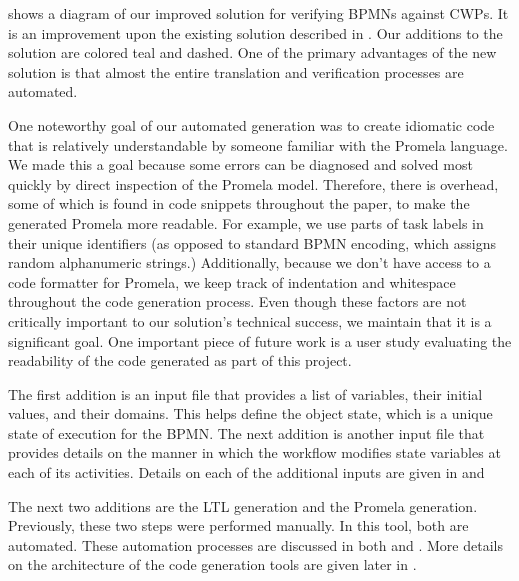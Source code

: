 \begin{comment}
Automatic translation from CWP and BPMN to LTL properties and Promela code, respectively, is not trivial. First, the edges of the CWP must follow a consistent expression language in order to be interpreted automatically. Next, the object state must be clearly defined. Also, several implied BPMN semantics lead to ambiguous workflow structures, requiring additional automated reasoning. Next, the complete conditions of decision gateways in the workflow must be expressed somewhere. Finally, the environment for running the workflow must be defined, including variables and behavior models for BPMN activities.
\end{comment}

 shows a diagram of our improved solution for verifying BPMNs against CWPs. It is an improvement upon the existing solution described in . Our additions to the solution are colored teal and dashed. One of the primary advantages of the new solution is that almost the entire translation and verification processes are automated.

One noteworthy goal of our automated generation was to create idiomatic code that is relatively understandable by someone familiar with the Promela language. We made this a goal because some errors can be diagnosed and solved most quickly by direct inspection of the Promela model. Therefore, there is overhead, some of which is found in code snippets throughout the paper, to make the generated Promela more readable. For example, we use parts of task labels in their unique identifiers (as opposed to standard BPMN encoding, which assigns random alphanumeric strings.) Additionally, because we don't have access to a code formatter for Promela, we keep track of indentation and whitespace throughout the code generation process. Even though these factors are not critically important to our solution's technical success, we maintain that it is a significant goal. One important piece of future work is a user study evaluating the readability of the code generated as part of this project.

The first addition is an input file that provides a list of variables, their initial values, and their domains. This helps define the object state, which is a unique state of execution for the BPMN. The next addition is another input file that provides details on the manner in which the workflow modifies state variables at each of its activities. Details on each of the additional inputs are given in  and 

The next two additions are the LTL generation and the Promela generation. Previously, these two steps were performed manually. In this tool, both are automated. These automation processes are discussed in both  and . More details on the architecture of the code generation tools are given later in .
